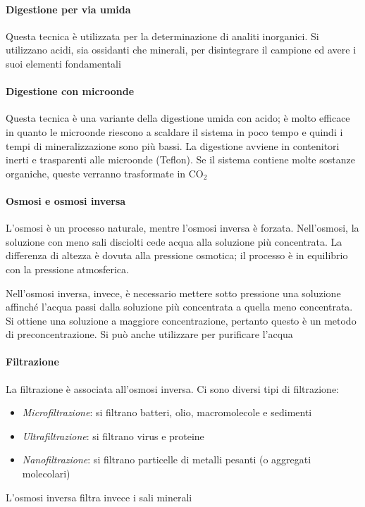 \paragraph{Digestione per via umida}
Questa tecnica è utilizzata per la determinazione di analiti inorganici.
Si utilizzano acidi, sia ossidanti che minerali, per disintegrare il campione ed avere i suoi elementi fondamentali

\paragraph{Digestione con microonde}
Questa tecnica è una variante della digestione umida con acido; è molto efficace in quanto le microonde riescono a scaldare il sistema in poco tempo e quindi i tempi di mineralizzazione sono più bassi.
La digestione avviene in contenitori inerti e trasparenti alle microonde (Teflon).
Se il sistema contiene molte sostanze organiche, queste verranno trasformate in CO$_2$ 

\paragraph{Osmosi e osmosi inversa}
L'osmosi è un processo naturale, mentre l'osmosi inversa è forzata.
Nell'osmosi, la soluzione con meno sali disciolti cede acqua alla soluzione più concentrata.
La differenza di altezza è dovuta alla pressione osmotica; il processo è in equilibrio con la pressione atmosferica.

Nell'osmosi inversa, invece, è necessario mettere sotto pressione una soluzione affinché l'acqua passi dalla soluzione più concentrata a quella meno concentrata.
Si ottiene una soluzione a maggiore concentrazione, pertanto questo è un metodo di preconcentrazione. Si può anche utilizzare per purificare l'acqua

\paragraph{Filtrazione}
La filtrazione è associata all'osmosi inversa. Ci sono diversi tipi di filtrazione:
\begin{itemize}
\item \textit{Microfiltrazione}: si filtrano batteri, olio, macromolecole e sedimenti
\item \textit{Ultrafiltrazione}: si filtrano virus e proteine
\item \textit{Nanofiltrazione}: si filtrano particelle di metalli pesanti (o aggregati molecolari)
\end{itemize}
L'osmosi inversa filtra invece i sali minerali

